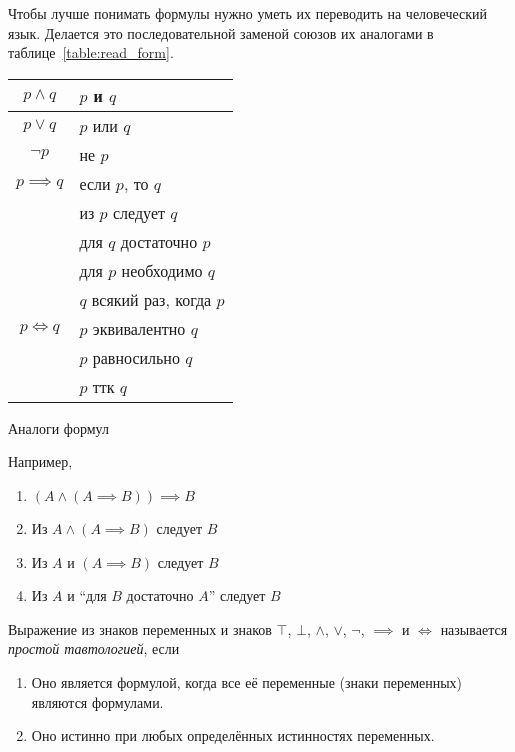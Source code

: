Чтобы лучше понимать формулы нужно уметь их переводить на человеческий язык. Делается
это последовательной заменой союзов их аналогами в таблице~\ref{table:read_form}.
\begin{margintable}
	\begin{tabular}{cl}
		$p\land q$    & $p$ и $q$                 \\\hline
		$p\lor q$     & $p$ или $q$               \\\hline
		$\lnot p$     & не $p$                    \\\hline
		$p\implies q$ & если $p$, то $q$          \\
		              & из $p$ следует $q$        \\
		              & для $q$ достаточно $p$    \\
		              & для $p$ необходимо $q$    \\
		              & $q$ всякий раз, когда $p$ \\\hline
		$p\iff q$     & $p$ эквивалентно $q$      \\
		              & $p$ равносильно $q$       \\
		              & $p$ ттк $q$
	\end{tabular}
	\caption{Аналоги формул}\label{table:read_form}
\end{margintable}

Например,
\begin{enumerate}
	\item{}$(A\land (A\implies B))\implies B$
	\item{}Из $A\land (A\implies B)$ следует $B$
	\item{}Из $A$ и $(A\implies B)$ следует $B$
	\item{}Из $A$ и ``для $B$ достаточно $A$'' следует $B$
\end{enumerate}

\pagebreak

Выражение из знаков переменных и знаков $\top$, $\bot$, $\land$, $\lor$, $\lnot$,
$\implies$ и $\iff$ называется {\it простой тавтологией}, если
\begin{multicols}{2}
	\begin{enumerate}
		\item{}Оно является формулой, когда все её переменные (знаки переменных)
		являются формулами.
		\columnbreak
		\item{}Оно истинно при любых определённых истинностях переменных.
	\end{enumerate}
\end{multicols}

